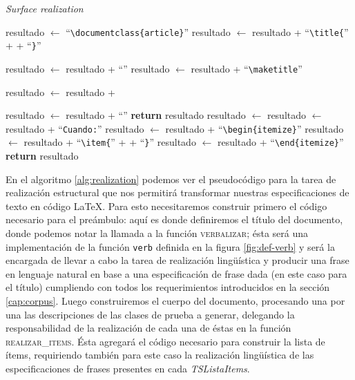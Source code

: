 \begin{algorithm}
  \caption{\textit{Surface realization}}\label{alg:realization}
  \begin{algorithmic}[1]
  
  \State resultado $\gets$ ``\verb|\documentclass{article}|''
  \State resultado $\gets$ resultado + ``\verb|\title{|'' +  + ``\verb|}|''
  
  \State resultado $\gets$ resultado + ``\verb||''
  \State resultado $\gets$ resultado + ``\verb|\maketitle|''
  
    \State resultado $\gets$ resultado +   
  \EndFor

  \State resultado $\gets$ resultado + ``\verb||''
  \State \textbf{return} resultado
  \EndFunction
  \Statex
    \State resultado $\gets$  
	\State resultado $\gets$ resultado + ``\verb|Cuando:|''
    \State resultado $\gets$ resultado + ``\verb|\begin{itemize}|''
      \State resultado $\gets$ resultado + ``\verb|\item{|'' +  + ``\verb|}|'' 
    \EndFor  
    \State resultado $\gets$ resultado + ``\verb|\end{itemize}|''
    \State \textbf{return} resultado
  \EndFunction
\end{algorithmic}
\end{algorithm}

En el algoritmo \ref{alg:realization} podemos ver el pseudocódigo para la tarea de realización estructural que nos permitirá transformar nuestras especificaciones de texto en código \LaTeX. Para esto necesitaremos construir primero el código necesario para el preámbulo: aquí es donde definiremos el título del documento, donde podemos notar la llamada a la función \textsc{verbalizar}; ésta será una implementación de la función \texttt{verb} definida en la figura \ref{fig:def-verb} y será la encargada de llevar a cabo la tarea de realización lingüística y producir una frase en lenguaje natural en base a una especificación de frase dada (en este caso para el título) cumpliendo con todos los requerimientos introducidos en la sección \ref{cap:corpus}. Luego construiremos el cuerpo del documento, procesando una por una las descripciones de las clases de prueba a generar, delegando la responsabilidad de la realización de cada una de éstas en la función \textsc{realizar\_items}. Ésta agregará el código necesario para construir la lista de ítems, requiriendo también para este caso la realización lingüística de las especificaciones de frases presentes en cada \emph{TSListaItems}.

